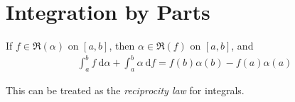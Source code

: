 \documentclass[thmcnt=section, 12pt]{elegantbook}
\begin{document}

\section{Integration by Parts}


\begin{theorem}
    If $f \in \mathfrak{R}(\alpha)$ on $[a, b]$, then $\alpha \in \mathfrak{R}(f)$ on $[a, b]$, and 
    \begin{align*}
        \int_a^b f \ \mathrm{d}\alpha
        + \int_a^b \alpha \ \mathrm{d}f
        = f(b)\alpha(b) - f(a)\alpha(a)
    \end{align*}
\end{theorem}

\begin{remark}
    This can be treated as the \textit{reciprocity law} for integrals.
\end{remark}
\end{document}
